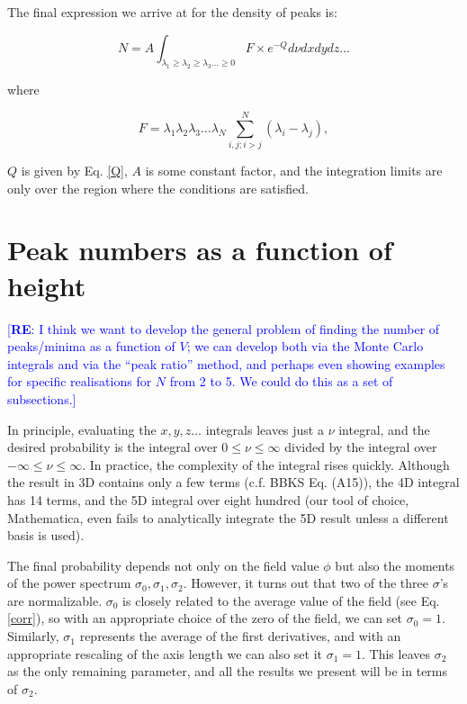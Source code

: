 \documentclass[12pt]{article}
\newcommand{\re}[1]{\textcolor{blue}{[{\bf RE}: #1]}}
\begin{document}
The final expression we arrive at for the density of peaks is:

\begin{equation} \label{DensityOfPeaks}
N = A \int_{\lambda_1 \geq \lambda_2 \geq \lambda_3 \ldots \geq 0} F \times e^{-Q} d\nu dx dy dz \ldots
\end{equation}

\noindent where

\begin{equation}
F = \lambda_1\lambda_2\lambda_3\ldots\lambda_N \sum^N_{i,j; i>j} (\lambda_i - \lambda_j),
\end{equation}

\noindent $Q$ is given by Eq. \ref{Q}, $A$ is some constant factor, and the integration limits are only over the region where the conditions are satisfied. 

\section{Peak numbers as a function of height}

\re{I think we want to develop the general problem of finding the number of peaks/minima as a function of $V$; we can develop both via the Monte Carlo integrals and via the ``peak ratio'' method, and perhaps even showing examples for specific realisations for $N$ from 2 to 5.  We could do this as a set of subsections.}  

In principle, evaluating the $x, y, z \ldots$ integrals leaves just a $\nu$ integral, and the desired probability is the integral over $0 \leq \nu \leq \infty$ divided by the integral over $-\infty \leq \nu \leq \infty$. In practice, the complexity of the integral rises quickly. Although the result in 3D contains only a few terms (c.f. BBKS Eq. (A15)), the 4D integral has 14 terms, and the 5D integral over eight hundred (our tool of choice, Mathematica, even fails to analytically integrate the 5D result unless a different basis is used).


The final probability depends not only on the field value $\phi$ but also the moments of the power spectrum $\sigma_0, \sigma_1, \sigma_2$. However, it turns out that two of the three $\sigma$'s are normalizable. $\sigma_0$ is closely related to the average value of the field (see Eq. \ref{corr}), so with an appropriate choice of the zero of the field, we can set $\sigma_0 = 1$. Similarly, $\sigma_1$ represents the average of the first derivatives, and with an appropriate rescaling of the axis length we can also set it $\sigma_1 = 1$. This leaves $\sigma_2$ as the only remaining parameter, and all the results we present will be in terms of $\sigma_2$.
\end{document}
